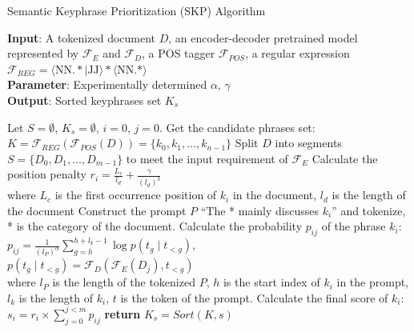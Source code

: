 \documentclass[11pt]{article}
\begin{document}
\begin{algorithm*}[htb]
    \scriptsize
    \caption{Semantic Keyphrase Prioritization (SKP) Algorithm}
    \label{alg:algorithm}
    \begin{multicols}{2}
    \vspace*{-7mm}
    \textbf{Input}: A tokenized document $D$, an encoder-decoder pretrained model represented by $\mathcal{F}_E$ and $\mathcal{F}_D$, a POS tagger $\mathcal{F}_{POS}$, a regular expression $\mathcal{F}_{REG} = \langle \text{NN.} \ast |\text{JJ} \rangle \ast \langle \text{NN.} \ast \rangle$\\
    \textbf{Parameter}: Experimentally determined $\alpha$, $\gamma$  \\
    \textbf{Output}: Sorted keyphrases set $K_{s}$\\
        \begin{algorithmic}[1] %
            \STATE Let $S=\emptyset$, $K_{s}=\emptyset$, $i=0$, $j=0$.
            \STATE Get the candidate phrases set: \\ $K=\mathcal{F}_{REG}(\mathcal{F}_{POS}(D))=\{k_0, k_1, \dots, k_{n-1}\}$
            \STATE Split $D$ into segments $S=\{D_0, D_1, \dots, D_{m-1}\}$ to meet the input requirement of $\mathcal{F}_E$
            \STATE Calculate the position penalty $r_i=\frac{L_c}{l_{d}} + \frac{\gamma}{(l_{d})^3}$\\
            where $L_c$ is the first occurrence position of $k_i$ in the document, $l_d$ is the length of the document 
            \STATE Construct the prompt $P$ “The * mainly discusses $k_i$” and tokenize, * is the category of the document.
            \STATE Calculate the probability $p_{ij}$ of the phrase $k_i$: \\
            $p_{ij} = \frac{1}{(l_P)^\alpha} \sum_{g=h}^{h+l_k-1} \log p(t_g \mid t_{<g})$, \\
            $p(t_g \mid t_{<g})=\mathcal{F}_D(\mathcal{F}_E(D_j), t_{<g})$ \\
            where $l_P$ is the length of the tokenized $P$, $h$ is the start index of $k_i$ in the prompt, $l_k$ is the length of $k_i$, $t$ is the token of the prompt.
            \ENDFOR
            \STATE Calculate the final score of $k_i$: $s_i=r_i\times\sum_{j=0}^{j<m}p_{ij}$
            \ENDFOR
            \STATE \textbf{return} $K_{s}=Sort(K, s)$
        \end{algorithmic}
    \end{multicols}
    \vspace*{-4mm}
\end{algorithm*}
\end{document}
